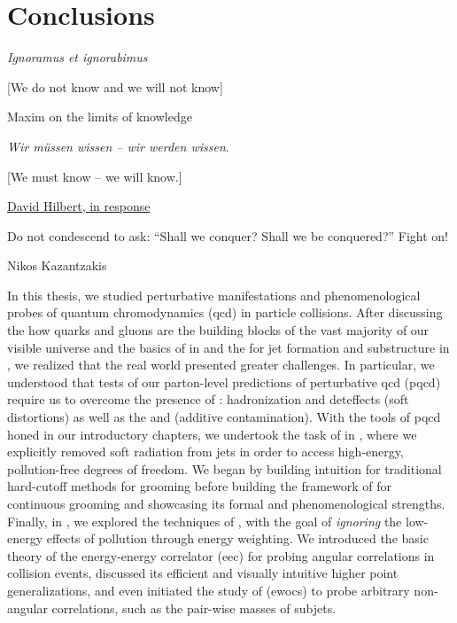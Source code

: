 \chapter{Conclusions}
\label{sec:Conclusions}

\epigraph{
    \textit{Ignoramus et ignorabimus}

    [We do not know and we will not know]
}{
    Maxim on the limits of knowledge
}

\epigraph{
    \textit{Wir m\"ussen wissen -- wir werden wissen}.

    [We must know -- we will know.]
}{
    \href{smith-at-sfsu.net/Documents/HilbertRadio/HilbertRadio.mp3}{David Hilbert, in response}
}

\epigraph{
    Do not condescend to ask:
    ``Shall we conquer? Shall we be conquered?''
    Fight on!
}{
    Nikos Kazantzakis
}

In this thesis, we studied perturbative manifestations and phenomenological probes of quantum chromodynamics (\gls{qcd}) in particle collisions.
%
After discussing the how quarks and gluons are the building blocks of the vast majority of our visible universe and the basics of  in  and the  for jet formation and substructure in , we realized that the real world presented greater challenges.
%
In particular, we understood that tests of our parton-level predictions of perturbative \gls{qcd} (\gls{pqcd}) require us to overcome the presence of :
%
\gls{hadronization} and \gls{deteffects} (soft distortions) as well as the  and  (additive contamination).
%
With the tools of \gls{pqcd} honed in our introductory chapters, we undertook the task of  in , where we explicitly removed soft radiation from jets in order to access high-energy, pollution-free degrees of freedom.
%
We began by building intuition for traditional hard-cutoff methods for grooming before building the framework of \PIRANHA{} for continuous grooming and showcasing its formal and phenomenological strengths.
%
Finally, in , we explored the techniques of , with the goal of \textit{ignoring} the low-energy effects of pollution through energy weighting.
%
We introduced the basic theory of the energy-energy correlator (\gls{eec}) for probing angular correlations in collision events, discussed its efficient and visually intuitive higher point generalizations, and even initiated the study of  (\glspl{ewoc}) to probe arbitrary non-angular correlations, such as the pair-wise masses of subjets.


